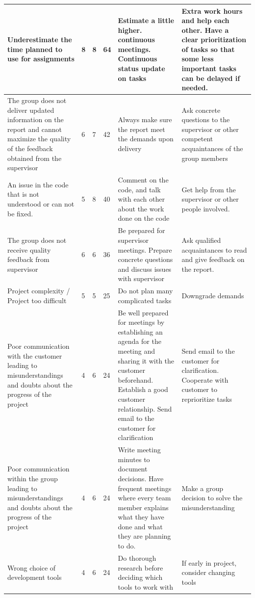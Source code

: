 \begin{appendices}
\begin{longtable}{ | p{4.5cm} | p{1cm} | p{1cm} | p{1cm} | p{4.5cm} | p{4.5cm} |}
	
	Underestimate the time planned to use for assignments & 8 & 8 & 64 & Estimate a little higher. continuous meetings. Continuous status update on tasks & Extra work hours and help each other. Have a clear prioritization of tasks so that some less important tasks can be delayed if needed. \\ \hline
	
	The group does not deliver updated information on the report and cannot maximize the quality of the feedback obtained from the supervisor & 6 & 7 & 42 & Always make sure the report meet the demands upon delivery & Ask concrete questions to the supervisor or other competent acquaintances of the group members \\ \hline
	
	An issue in the code that is not understood or can not be fixed. & 5 & 8 & 40 & Comment on the code, and talk with each other about the work done on the code & Get help from the supervisor or other people involved. \\ \hline
	
	The group does not receive quality feedback from supervisor & 6 & 6 & 36 & Be prepared for supervisor meetings. Prepare concrete questions and discuss issues with supervisor & Ask qualified acquaintances to read and give feedback on the report.  \\ \hline
	
	Project complexity / Project too difficult & 5 & 5 & 25 & Do not plan many complicated tasks & Downgrade demands \\ \hline
	
	Poor communication with the customer leading to misunderstandings and doubts about the progress of the project & 4 & 6 & 24 & Be well prepared for meetings by establishing an agenda for the meeting and sharing it with the customer beforehand. Establish a good customer relationship. Send email to the customer for clarification & Send email to the customer for clarification. Cooperate with customer to reprioritize tasks \\ \hline
	
	Poor communication within the group leading to misunderstandings and doubts about the progress of the project & 4 & 6 & 24 & Write meeting minutes to document decisions. Have frequent meetings where every team member explains what they have done and what they are planning to do. & Make a group decision to solve the misunderstanding \\ \hline
	
	Wrong choice of development tools & 4 & 6 & 24 & Do thorough research before deciding which tools to work with & If early in project, consider changing tools \\ \hline
	

\end{longtable}
\end{appendices}
